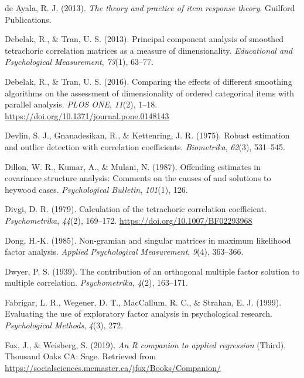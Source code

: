 \documentclass[
  english,
  man]{apa6}
\begin{document}
\leavevmode\hypertarget{ref-de2013theory}{}%
de Ayala, R. J. (2013). \emph{The theory and practice of item response theory}. Guilford Publications.

\leavevmode\hypertarget{ref-debelak2013}{}%
Debelak, R., \& Tran, U. S. (2013). Principal component analysis of smoothed tetrachoric correlation matrices as a measure of dimensionality. \emph{Educational and Psychological Measurement}, \emph{73}(1), 63--77.

\leavevmode\hypertarget{ref-debelak2016}{}%
Debelak, R., \& Tran, U. S. (2016). Comparing the effects of different smoothing algorithms on the assessment of dimensionality of ordered categorical items with parallel analysis. \emph{PLOS ONE}, \emph{11}(2), 1--18. \url{https://doi.org/10.1371/journal.pone.0148143}

\leavevmode\hypertarget{ref-devlin1975robust}{}%
Devlin, S. J., Gnanadesikan, R., \& Kettenring, J. R. (1975). Robust estimation and outlier detection with correlation coefficients. \emph{Biometrika}, \emph{62}(3), 531--545.

\leavevmode\hypertarget{ref-dillon1987}{}%
Dillon, W. R., Kumar, A., \& Mulani, N. (1987). Offending estimates in covariance structure analysis: Comments on the causes of and solutions to heywood cases. \emph{Psychological Bulletin}, \emph{101}(1), 126.

\leavevmode\hypertarget{ref-divgi1979}{}%
Divgi, D. R. (1979). Calculation of the tetrachoric correlation coefficient. \emph{Psychometrika}, \emph{44}(2), 169--172. \url{https://doi.org/10.1007/BF02293968}

\leavevmode\hypertarget{ref-dong1985non}{}%
Dong, H.-K. (1985). Non-gramian and singular matrices in maximum likelihood factor analysis. \emph{Applied Psychological Measurement}, \emph{9}(4), 363--366.

\leavevmode\hypertarget{ref-dwyer1939contribution}{}%
Dwyer, P. S. (1939). The contribution of an orthogonal multiple factor solution to multiple correlation. \emph{Psychometrika}, \emph{4}(2), 163--171.

\leavevmode\hypertarget{ref-fabrigar1999evaluating}{}%
Fabrigar, L. R., Wegener, D. T., MacCallum, R. C., \& Strahan, E. J. (1999). Evaluating the use of exploratory factor analysis in psychological research. \emph{Psychological Methods}, \emph{4}(3), 272.

\leavevmode\hypertarget{ref-R-car}{}%
Fox, J., \& Weisberg, S. (2019). \emph{An R companion to applied regression} (Third). Thousand Oaks CA: Sage. Retrieved from \url{https://socialsciences.mcmaster.ca/jfox/Books/Companion/}
\end{document}
